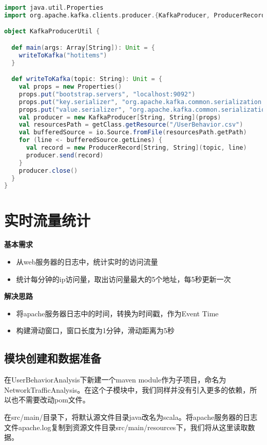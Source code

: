\documentclass[oneside]{ctexbook}
\begin{document}
\begin{lstlisting}[language=scala]
import java.util.Properties
import org.apache.kafka.clients.producer.{KafkaProducer, ProducerRecord}

object KafkaProducerUtil {

  def main(args: Array[String]): Unit = {
    writeToKafka("hotitems")
  }

  def writeToKafka(topic: String): Unit = {
    val props = new Properties()
    props.put("bootstrap.servers", "localhost:9092")
    props.put("key.serializer", "org.apache.kafka.common.serialization.StringSerializer")
    props.put("value.serializer", "org.apache.kafka.common.serialization.StringSerializer")
    val producer = new KafkaProducer[String, String](props)
    val resourcesPath = getClass.getResource("/UserBehavior.csv")
    val bufferedSource = io.Source.fromFile(resourcesPath.getPath)
    for (line <- bufferedSource.getLines) {
      val record = new ProducerRecord[String, String](topic, line)
      producer.send(record)
    }
    producer.close()
  }
}
\end{lstlisting}

\section{实时流量统计}

\textbf{基本需求}
\begin{itemize}
\item 从web服务器的日志中，统计实时的访问流量
\item 统计每分钟的ip访问量，取出访问量最大的5个地址，每5秒更新一次
\end{itemize}
\textbf{解决思路}
\begin{itemize}
\item 将apache服务器日志中的时间，转换为时间戳，作为Event Time
\item 构建滑动窗口，窗口长度为1分钟，滑动距离为5秒
\end{itemize}

\subsection{模块创建和数据准备}

在UserBehaviorAnalysis下新建一个maven module作为子项目，命名为NetworkTrafficAnalysis。在这个子模块中，我们同样并没有引入更多的依赖，所以也不需要改动pom文件。

在src/main/目录下，将默认源文件目录java改名为scala。将apache服务器的日志文件apache.log复制到资源文件目录src/main/resources下，我们将从这里读取数据。
\end{document}
